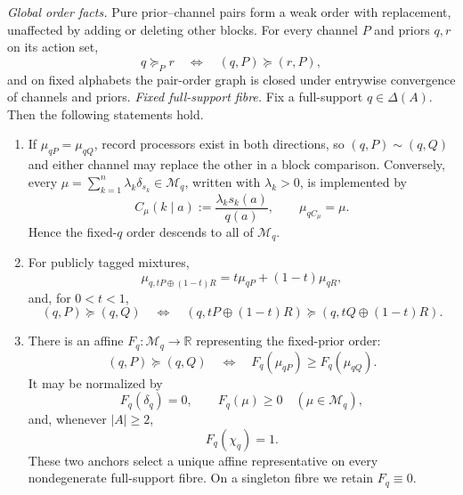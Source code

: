 \begin{lemma}
\label{pt:lem:pure-affine}
\label{pt:lem:blockcoh}
\label{pt:lem:blackwell}\label{pt:lem:plsuff}
\label{pt:lem:publiccoin}
\label{pt:lem:postsep}
\label{pt:lem:convnorm}
\emph{Global order facts.}
Pure prior--channel pairs form a weak order with replacement, unaffected by
adding or deleting other blocks.  For every channel $P$ and priors $q,r$ on
its action set,
\begin{equation}
 q\succeq_P r
 \quad\Longleftrightarrow\quad
 (q,P)\succeq(r,P),
 \label{pt:eq:within-to-pair}
\end{equation}
and on fixed alphabets the pair-order graph is closed under entrywise
convergence of channels and priors.  \emph{Fixed full-support fibre.}
Fix a full-support $q\in\Delta(A)$.
Then the following statements hold.

\begin{enumerate}[label=\textup{(\alph*)},leftmargin=*]
\item If $\mu_{qP}=\mu_{qQ}$, record processors exist in both directions,
  so $(q,P)\sim(q,Q)$ and either channel may replace the other in a block
  comparison.  Conversely, every
  $\mu=\sum_{k=1}^n\lambda_k\delta_{s_k}\in\mathcal M_q$, written with
  $\lambda_k>0$, is implemented by
  \begin{equation}
   C_\mu(k\mid a):=\frac{\lambda_ks_k(a)}{q(a)},
   \qquad \mu_{qC_\mu}=\mu.
   \label{pt:eq:canonical-implementation}
  \end{equation}
  Hence the fixed-$q$ order descends to all of $\mathcal M_q$.

\item For publicly tagged mixtures,
  \begin{equation}
   \mu_{q,tP\oplus(1-t)R}
   =t\mu_{qP}+(1-t)\mu_{qR},
   \label{pt:eq:public-posterior-mixture}
  \end{equation}
  and, for $0<t<1$,
  \[
   (q,P)\succeq(q,Q)
   \quad\Longleftrightarrow\quad
   (q,tP\oplus(1-t)R)\succeq(q,tQ\oplus(1-t)R).
  \]

\item There is an affine $F_q:\mathcal M_q\to\mathbb R$ representing the
  fixed-prior order:
  \begin{equation}
   (q,P)\succeq(q,Q)
   \quad\Longleftrightarrow\quad
   F_q(\mu_{qP})\ge F_q(\mu_{qQ}).
   \label{pt:eq:fibre-representation}
  \end{equation}
  It may be normalized by
\begin{equation}
 F_q(\delta_q)=0,
 \qquad
 F_q(\mu)\ge0\quad(\mu\in\mathcal M_q),
 \label{pt:eq:zero-minimum}
\end{equation}
and, whenever $|A|\ge2$,
\begin{equation}
 F_q(\chi_q)=1.
 \label{pt:eq:full-revelation-anchor}
\end{equation}
These two anchors select a unique affine representative on every
nondegenerate full-support fibre.  On a singleton fibre we retain
$F_q\equiv0$.
\end{enumerate}
\end{lemma}

